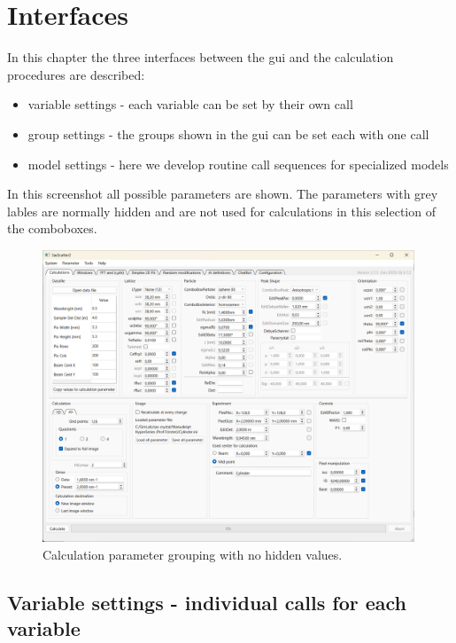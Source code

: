 \documentclass[11pt]{article} %
\begin{document}
\clearpage
\section{Interfaces}

In this chapter the three interfaces between the gui and the calculation procedures are described:
\begin{itemize}\itemsep0pt
\item variable settings - each variable can be set by their own call
\item group settings - the groups shown in the gui can be set each with one call
\item model settings - here we develop routine call sequences for specialized models
\end{itemize}
In this screenshot all possible parameters are shown. The parameters with grey lables are normally hidden and are not used for calculations in this selection of the comboboxes.
\begin{figure}[H]
 \centering
 \includegraphics[width=0.99\textwidth]{gui-calculations-nohidden.png}
 \caption{Calculation parameter grouping with no hidden values.}
\end{figure}

\subsection{Variable settings - individual calls for each variable}
\end{document}
